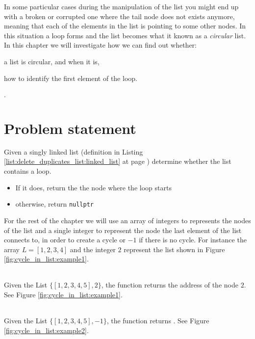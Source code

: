 In some particular cases during the manipulation of the list you might end up with a broken or corrupted one  where the tail node does not exists anymore, meaning that
each of the elements in the list is pointing to some other nodes.
In this situation a loop forms and the list becomes what it known as a \textit{circular} list.
In this chapter we will investigate how we can find out whether:
\begin{enumerate*}
	\item a list is circular, and when it is,
	\item how to identify the first element of the loop.
\end{enumerate*}.

\section{Problem statement}
\begin{exercise}
Given a singly linked list (definition in Listing \ref{list:delete_duplicates_list:linked_list} at
page \pageref{list:delete_duplicates_list:linked_list}) determine whether the list contains a loop.
\begin{itemize}
		\item If it does, return the the node where the loop starts
		\item otherwise, return \lstinline[columns=fixed]{nullptr}
\end{itemize}

For the rest of the chapter we will use an array of integers to represents the nodes of the list and
a single integer to represent the node the last element of the list connects to, in order to create
a cycle or $-1$ if there is no cycle. For instance  the array $L=[1,2,3,4]$ and the integer $2$
represent the list shown in Figure \ref{fig:cycle_in_list:example1}.

\begin{example}
	\hfill \\
	Given the List $\{[1,2,3,4,5],2\}$, the function returns the address of the node $2$. See Figure
	\ref{fig:cycle_in_list:example1}.
\end{example}

\begin{example}
	\hfill \\
	Given the List $\{[1,2,3,4,5],-1\}$, the function returns . See Figure
	\ref{fig:cycle_in_list:example2}.
\end{example}
\end{exercise}

